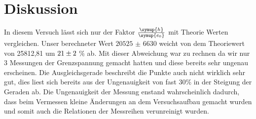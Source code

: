 \section{Diskussion}
    In diesem Versuch lässt sich nur der Faktor $\frac{\symup{h}}{\symup{e_0}}$ mit Theorie Werten vergleichen.
    Unser berechneter Wert $\num{20525(6630)}$ weicht von dem Theoriewert von 25812,81 um $\num{21 (2)}$ \% ab.
    Mit dieser Abweichung war zu rechnen da wir nur 3 Messungen der Grenzspannung gemacht hatten und diese bereits sehr ungenau erscheinen.
    Die Ausgleichsgerade beschreibt die Punkte auch nicht wirklich sehr gut, dies liest sich bereits aus der Ungenauigkeit von fast 30\% in der 
    Steigung der Geraden ab. Die Ungenauigkeit der Messung enstand wahrscheinlich dadurch, dass beim Vermessen kleine Änderungen an dem 
    Versuchsaufbau gemacht wurden und somit auch die Relationen der Messreihen verunreinigt wurden.